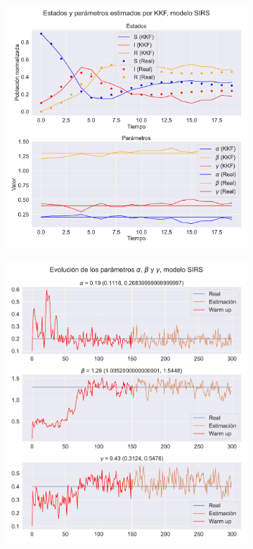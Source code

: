 \begin{figure}[h!]
    \centering
    \begin{subfigure}[b]{0.49\textwidth}
         \centering
         \includegraphics[height=0.9\linewidth]{img/content/chapter4/nonlinear_filters_sirs_params.pdf}
         \caption{}
         \label{fig:nonlinear_filters_sirs_params}
    \end{subfigure}
    \begin{subfigure}[b]{0.49\textwidth}
         \centering \includegraphics[height=0.9\linewidth]{img/content/chapter4/nonlinear_filters_sirs_params_evolution.pdf}

\end{subfigure}
\end{figure}
